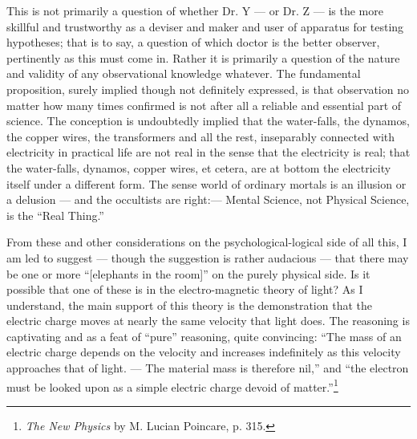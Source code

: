 \documentclass[a4paper, 11pt, oneside, polutonikogreek, english, landscape]{article}
\begin{document}
This is not primarily a question of whether Dr. Y --- or Dr. Z --- is the more skillful and trustworthy as a deviser and maker and user of apparatus for testing hypotheses; that is to say, a question of which doctor is the better observer, pertinently as this must come in. Rather it is primarily a question of the nature and validity of any observational knowledge whatever. The fundamental proposition, surely implied though not definitely expressed, is that observation no matter how many times confirmed is not after all a reliable and essential part of science. The conception is undoubtedly implied that the water-falls, the dynamos, the copper wires, the transformers and all the rest, inseparably connected with electricity in practical life are not real in the sense that the electricity is real; that the water-falls, dynamos, copper wires, et cetera, are at bottom the electricity itself under a different form. The sense world of ordinary mortals is an illusion or a delusion --- and the occultists are right:--- Mental Science, not Physical Science, is the ``Real Thing.''

From these and other considerations on the psychological-logical side of all this, I am led to suggest --- though the suggestion is rather audacious --- that there may be one or more ``[elephants in the room]'' on the purely physical side. Is it possible that one of these is in the electro-magnetic theory of light? As I understand, the main support of this theory is the demonstration that the electric charge moves at nearly the same velocity that light does. The reasoning is captivating and as a feat of ``pure'' reasoning, quite convincing: ``The mass of an electric charge depends on the velocity and increases indefinitely as this velocity approaches that of light. --- The material mass is therefore nil,'' and ``the electron must be looked upon as a simple electric charge devoid of matter.''\footnote{\emph{The New Physics} by M. Lucian Poincare, p. 315.}
\end{document}
